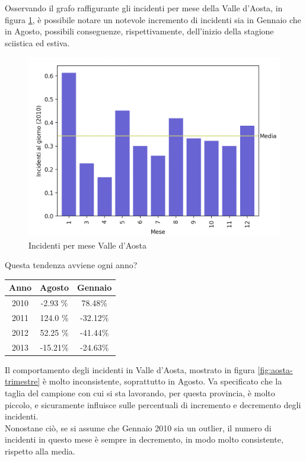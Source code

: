 \documentclass[a4paper]{report}
\begin{document}
Osservando il grafo raffigurante gli incidenti per mese della Valle d'Aosta, 
in figura \ref{fig:aosta}, 
è possibile notare un notevole incremento di incidenti sia in Gennaio che in Agosto, possibili 
conseguenze, rispettivamente, dell'inizio della stagione sciistica ed estiva.

\begin{figure}
    \includegraphics[width=\linewidth]{../src/incidenti/incidenti_senza_coords/mese_incidenti/aosta_mese.png}
    \caption{Incidenti per mese Valle d'Aosta}
    \label{fig:aosta}
\end{figure}

Questa tendenza avviene ogni anno?

\begin{center}
    \def\arraystretch{1.5}%
    \begin{tabular}{ |c|c|c| } 
    \hline
    Anno & Agosto & Gennaio \\ 
    \hline
    \rowcolor{TableGray}
    2010 & -2.93 \% & 78.48\%  \\ 
    2011 & 124.0 \% & -32.12\% \\
    \rowcolor{TableGray}
    2012 & 52.25 \% & -41.44\% \\
    2013 & -15.21\% & -24.63\% \\
    \hline
    \end{tabular}
\end{center}

Il comportamento degli incidenti in Valle d'Aosta, mostrato in figura \ref{fig:aosta-trimestre} 
è molto inconsistente, soprattutto in Agosto.
Va specificato che la taglia del campione con cui si sta lavorando, per questa provincia, 
è molto piccolo, e sicuramente influisce sulle percentuali di incremento e decremento 
degli incidenti.\\
Nonostane ciò, se si assume che Gennaio 2010 sia un outlier, il numero di incidenti in 
questo mese è sempre in decremento, in modo molto consistente, rispetto alla media.
\end{document}
